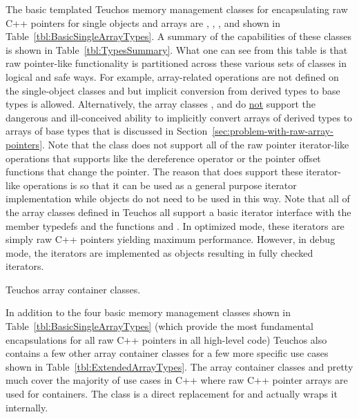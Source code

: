 \documentclass[pdf,ps2pdf,11pt]{SANDreport}
\begin{document}
The basic templated Teuchos memory management classes for
encapsulating raw C++ pointers for single objects and arrays are
{}, {}, {}, and {}
shown in Table~\ref{tbl:BasicSingleArrayTypes}.  A summary of the
capabilities of these classes is shown in
Table~\ref{tbl:TypesSummary}.  What one can see from this table is
that raw pointer-like functionality is partitioned across these
various sets of classes in logical and safe ways.  For example,
array-related operations are not defined on the single-object classes
{} and {} but implicit conversion from derived types
to base types is allowed.  Alternatively, the array classes
{}, and {} do {}\underline{not} support
the dangerous and ill-conceived ability to implicitly convert arrays
of derived types to arrays of base types that is discussed in
Section~\ref{sec:problem-with-raw-array-pointers}.  Note that the
class {} does not support all of the raw pointer
iterator-like operations that {} supports like the
dereference operator {} or the pointer offset
functions that change the pointer.  The reason that {}
does support these iterator-like operations is so that it can be used
as a general purpose iterator implementation while {}
objects do not need to be used in this way.  Note that all of the
array classes defined in Teuchos all support a basic iterator
interface with the {} member typedefs and the
functions {} and {}.  In optimized mode, these
iterators are simply raw C++ pointers yielding maximum performance.
However, in debug mode, the iterators are implemented as
{} objects resulting in fully checked iterators.

\begin{table}
\begin{center}

\end{center}
\caption{\label{tbl:ExtendedArrayTypes}
Teuchos array container classes.}
\end{table}

In addition to the four basic memory management classes shown in
Table~\ref{tbl:BasicSingleArrayTypes} (which provide the most
fundamental encapsulations for all raw C++ pointers in all high-level
code) Teuchos also contains a few other array container classes for a
few more specific use cases shown in
Table~\ref{tbl:ExtendedArrayTypes}.  The array container classes
{} and {} pretty much cover the majority of use
cases in C++ where raw C++ pointer arrays are used for containers.
The class {} is a direct replacement for
{} and actually wraps it internally.
\end{document}
